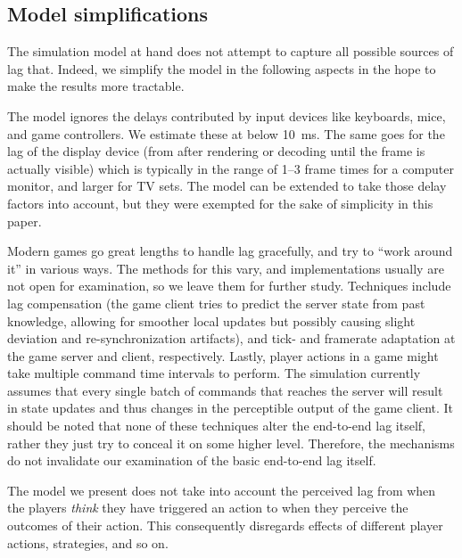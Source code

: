 \subsection{Model simplifications}

The simulation model at hand does not attempt to capture all possible 
sources of lag that. Indeed, we simplify the model in the 
following aspects in the hope to make the results more tractable.

The model ignores the delays contributed by 
input devices like keyboards, mice, and game controllers. We estimate 
these at below \SI{10}{\milli\second}. The same goes for the lag of 
the display device (from after rendering or decoding until the frame 
is actually visible) which is typically in the range of 1--3 
frame times for a computer 
monitor, and larger for TV sets. The model can be extended to take those delay factors into account, but they were exempted for the sake of simplicity in this paper.

Modern games go great lengths 
to handle lag gracefully, and try to ``work around it'' in various ways. 
The methods for this vary, and implementations usually are not open 
for examination, so we leave them for further study. 
Techniques include lag compensation (the game client 
tries to predict the server state from past knowledge, allowing for 
smoother local updates but possibly causing slight deviation and 
re-synchronization artifacts), and tick- and framerate adaptation 
at the game server and client, respectively.
Lastly, player actions in a game might take multiple command time 
intervals to perform. The simulation currently assumes that every 
single batch of commands that reaches the server will result in 
state updates and thus changes in the perceptible output of the game 
client. It should be noted that none of these techniques alter the 
end-to-end lag itself, rather they just try to conceal it on some higher level. 
Therefore, the mechanisms do not invalidate our examination of the basic 
end-to-end lag itself.

The model 
we present does not take into account the perceived lag from when the 
players \textit{think} they have triggered an action to when they 
perceive the outcomes of their action. This consequently disregards 
effects of different player actions, strategies, and so on.




